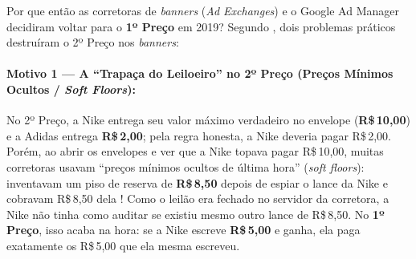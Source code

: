 Por que então as corretoras de \textit{banners} (\textit{Ad Exchanges}) e o Google Ad Manager decidiram voltar para o \textbf{1º Preço} em 2019? Segundo \cite{despotakis2021}, dois problemas práticos destruíram o 2º Preço nos \textit{banners}:

\paragraph{Motivo 1 --- A ``Trapaça do Leiloeiro'' no 2º Preço (Preços Mínimos Ocultos / \textit{Soft Floors}):}
No 2º Preço, a Nike entrega seu valor máximo verdadeiro no envelope (\textbf{R\$\,10,00}) e a Adidas entrega \textbf{R\$\,2,00}; pela regra honesta, a Nike deveria pagar R\$\,2,00. Porém, ao abrir os envelopes e ver que a Nike topava pagar R\$\,10,00, muitas corretoras usavam ``preços mínimos ocultos de última hora'' (\textit{soft floors}): inventavam um piso de reserva de \textbf{R\$\,8,50} depois de espiar o lance da Nike e cobravam R\$\,8,50 dela \cite[p.~3]{despotakis2021}! Como o leilão era fechado no servidor da corretora, a Nike não tinha como auditar se existiu mesmo outro lance de R\$\,8,50. No \textbf{1º Preço}, isso acaba na hora: se a Nike escreve \textbf{R\$\,5,00} e ganha, ela paga exatamente os R\$\,5,00 que ela mesma escreveu.

